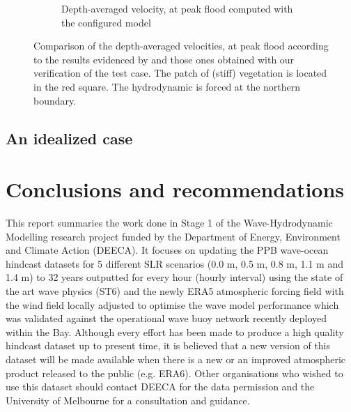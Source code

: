 \documentclass[12pt]{article}
\begin{document}
\begin{figure}[h]
\begin{subfigure}{.5\textwidth}
  \caption{Depth-averaged velocity, at peak flood computed with the configured model}
  \label{fig:depth_avg_vel_2}
\end{subfigure}
\caption{Comparison of the depth-averaged velocities, at peak flood according to the results evidenced by \textcite{Beudin2017} and those ones obtained with our verification of the test case. The patch of (stiff) vegetation is located in the red square. The hydrodynamic is forced at the northern boundary.}
\label{fig:grid_bathy_PPB}
\end{figure}

\subsection{An idealized case}

\section{Conclusions and recommendations}

This report summaries the work done in Stage 1 of the Wave-Hydrodynamic Modelling research project funded by the Department of Energy, Environment and Climate Action (DEECA). It focuses on updating the PPB wave-ocean hindcast datasets  for 5 different SLR scenarios (0.0 m, 0.5 m, 0.8 m, 1.1 m and 1.4 m) to 32 years outputted for every hour (hourly interval) using the state of the art wave physics (ST6) and the newly ERA5 atmospheric forcing field with the wind field locally adjusted to optimise the wave model performance which was validated against the operational wave buoy network recently deployed within the Bay.  
Although every effort has been made to produce a high quality hindcast dataset up to present time, it is believed that a new version of this dataset will be made available when there is a new or an improved atmospheric product released to the public (e.g. ERA6). Other organisations who wished to use this dataset should contact DEECA for the data permission and the University of Melbourne for a consultation and guidance. 
\end{document}
